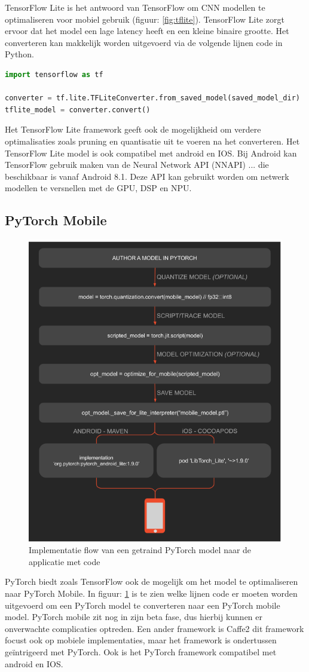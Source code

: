 TensorFlow Lite is het antwoord van TensorFlow om CNN modellen te optimaliseren voor mobiel gebruik (figuur: \ref{fig:tflite}).
TensorFlow Lite zorgt ervoor dat het model een lage latency heeft en een kleine binaire grootte.
Het converteren kan makkelijk worden uitgevoerd via de volgende lijnen code in Python.

\begin{lstlisting}[language=Python, caption=Converteren van TensorFlow naar een TensorFlow Lite model]
import tensorflow as tf

converter = tf.lite.TFLiteConverter.from_saved_model(saved_model_dir)
tflite_model = converter.convert()
\end{lstlisting}	

Het TensorFlow Lite framework geeft ook de mogelijkheid om verdere optimalisaties zoals pruning en quantisatie uit te voeren na het converteren.
Het TensorFlow Lite model is ook compatibel met android en IOS.
Bij Android kan TensorFlow gebruik maken van de Neural Network API (NNAPI) ... die beschikbaar is vanaf Android 8.1.
Deze API kan gebruikt worden om netwerk modellen te versnellen met de GPU, DSP en NPU.

\subsection{PyTorch Mobile}
\begin{figure}[!ht]
    \centering
 	\includegraphics[width=0.5\linewidth]{fig/PyTorch-mobile.png}
 	\caption{Implementatie flow van een getraind PyTorch model naar de applicatie met code}
 	\label{fig:pt_mobile}
\end{figure}

PyTorch biedt zoals TensorFlow ook de mogelijk om het model te optimaliseren naar PyTorch Mobile.
In figuur: \ref{fig:pt_mobile} is te zien welke lijnen code er moeten worden uitgevoerd om een PyTorch model te converteren naar een PyTorch mobile model.
PyTorch mobile zit nog in zijn beta fase, dus hierbij kunnen er onverwachte complicaties optreden.
Een ander framework is Caffe2 dit framework focust ook op mobiele implementaties, maar het framework is ondertussen ge\"intrigeerd met PyTorch.
Ook is het PyTorch framework compatibel met android en IOS.


